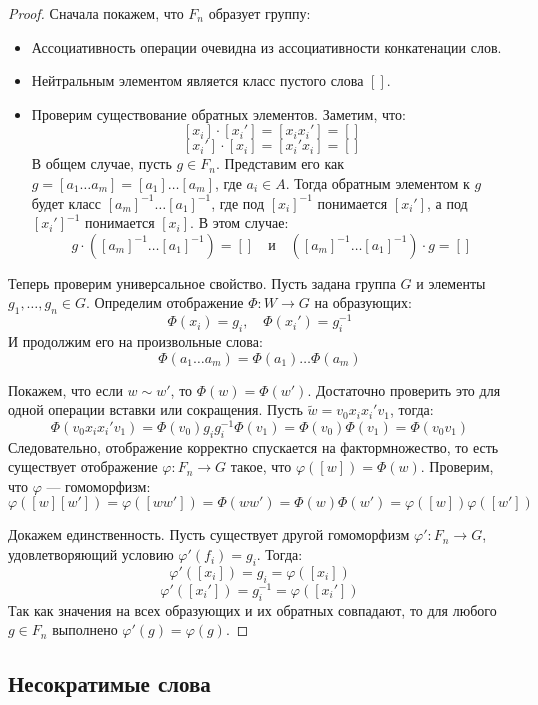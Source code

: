 \begin{proof}
	Сначала покажем, что $F_n$ образует группу:
	\begin{itemize}
		\item Ассоциативность операции очевидна из ассоциативности конкатенации слов.
		\item Нейтральным элементом является класс пустого слова $[]$.
		\item Проверим существование обратных элементов. Заметим, что:
		\[ [x_i] \cdot [x_i'] = [x_i x_i'] = [] \]
		\[ [x_i'] \cdot [x_i] = [x_i' x_i] = [] \]
		В общем случае, пусть $g \in F_n$. Представим его как $g = [a_1 \dots a_m] = [a_1] \dots [a_m]$, где $a_i \in A$. Тогда обратным элементом к $g$ будет класс $[a_m]^{-1} \dots [a_1]^{-1}$, где под $[x_i]^{-1}$ понимается $[x_i']$, а под $[x_i']^{-1}$ понимается $[x_i]$. В этом случае:
		\[ g \cdot \left([a_m]^{-1} \dots [a_1]^{-1}\right) = [] \quad \text{и} \quad \left([a_m]^{-1} \dots [a_1]^{-1}\right) \cdot g = [] \]
	\end{itemize}

	Теперь проверим универсальное свойство. Пусть задана группа $G$ и элементы $g_1, \dots, g_n \in G$. Определим отображение $\Phi: W \to G$ на образующих:
	\[ \Phi(x_i) = g_i, \quad \Phi(x_i') = g_i^{-1} \]
	И продолжим его на произвольные слова:
	\[ \Phi(a_1 \dots a_m) = \Phi(a_1) \dots \Phi(a_m) \]

	Покажем, что если $w \sim w'$, то $\Phi(w) = \Phi(w')$. Достаточно проверить это для одной операции вставки или сокращения. Пусть $\widetilde{w} = v_0 x_i x_i' v_1$, тогда:
	\[ \Phi(v_0 x_i x_i' v_1) = \Phi(v_0) g_i g_i^{-1} \Phi(v_1) = \Phi(v_0)\Phi(v_1) = \Phi(v_0 v_1) \]
	Следовательно, отображение корректно спускается на фактормножество, то есть существует отображение $\varphi: F_n \to G$ такое, что $\varphi([w]) = \Phi(w)$. Проверим, что $\varphi$ — гомоморфизм:
	\[ \varphi([w][w']) = \varphi([ww']) = \Phi(ww') = \Phi(w)\Phi(w') = \varphi([w])\varphi([w']) \]

	Докажем единственность. Пусть существует другой гомоморфизм $\varphi': F_n \to G$, удовлетворяющий условию $\varphi'(f_i) = g_i$. Тогда:
	\[ \varphi'([x_i]) = g_i = \varphi([x_i]) \]
	\[ \varphi'([x_i']) = g_i^{-1} = \varphi([x_i']) \]
	Так как значения на всех образующих и их обратных совпадают, то для любого $g \in F_n$ выполнено $\varphi'(g) = \varphi(g)$.
\end{proof}

\subsection*{Несократимые слова}

